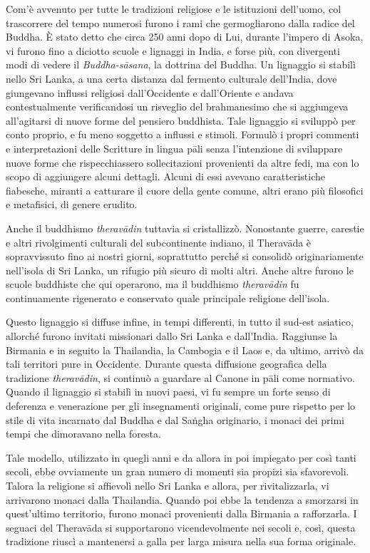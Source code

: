 Com'è avvenuto per tutte le tradizioni religiose e le istituzioni
dell'uomo, col trascorrere del tempo numerosi furono i rami che
germogliarono dalla radice del Buddha. È stato detto che circa 250 anni
dopo di Lui, durante l'impero di Asoka, vi furono fino a diciotto scuole
e lignaggi in India, e forse più, con divergenti modi di vedere il
\emph{Buddha-sāsana}, la dottrina del Buddha. Un lignaggio si stabilì
nello Sri Lanka, a una certa distanza dal fermento culturale dell'India,
dove giungevano influssi religiosi dall'Occidente e dall'Oriente e
andava contestualmente verificandosi un risveglio del brahmanesimo che
si aggiungeva all'agitarsi di nuove forme del pensiero buddhista. Tale
lignaggio si sviluppò per conto proprio, e fu meno soggetto a influssi e
stimoli. Formulò i propri commenti e interpretazioni delle Scritture in
lingua pāli senza l'intenzione di sviluppare nuove forme che
rispecchiassero sollecitazioni provenienti da altre fedi, ma con lo
scopo di aggiungere alcuni dettagli. Alcuni di essi avevano
caratteristiche fiabesche, miranti a catturare il cuore della gente
comune, altri erano più filosofici e metafisici, di genere erudito.

Anche il buddhismo \emph{theravādin} tuttavia si cristallizzò.
Nonostante guerre, carestie e altri rivolgimenti culturali del
subcontinente indiano, il Theravāda è sopravvissuto fino ai nostri
giorni, soprattutto perché si consolidò originariamente nell'isola di
Sri Lanka, un rifugio più sicuro di molti altri. Anche altre furono le
scuole buddhiste che qui operarono, ma il buddhismo \emph{theravādin} fu
continuamente rigenerato e conservato quale principale religione
dell'isola.

Questo lignaggio si diffuse infine, in tempi differenti, in tutto il
sud-est asiatico, allorché furono invitati missionari dallo Sri Lanka e
dall'India. Raggiunse la Birmania e in seguito la Thailandia, la
Cambogia e il Laos e, da ultimo, arrivò da tali territori pure in
Occidente. Durante questa diffusione geografica della tradizione
\emph{theravādin}, si continuò a guardare al Canone in pāli come
normativo. Quando il lignaggio si stabilì in nuovi paesi, vi fu sempre
un forte senso di deferenza e venerazione per gli insegnamenti
originali, come pure rispetto per lo stile di vita incarnato dal Buddha
e dal Saṅgha originario, i monaci dei primi tempi che dimoravano nella
foresta.

Tale modello, utilizzato in quegli anni e da allora in poi impiegato per
così tanti secoli, ebbe ovviamente un gran numero di momenti sia propizi
sia sfavorevoli. Talora la religione si affievolì nello Sri Lanka e
allora, per rivitalizzarla, vi arrivarono monaci dalla Thailandia.
Quando poi ebbe la tendenza a smorzarsi in quest'ultimo territorio,
furono monaci provenienti dalla Birmania a rafforzarla. I seguaci del
Theravāda si supportarono vicendevolmente nei secoli e, così, questa
tradizione riuscì a mantenersi a galla per larga misura nella sua forma
originale.

